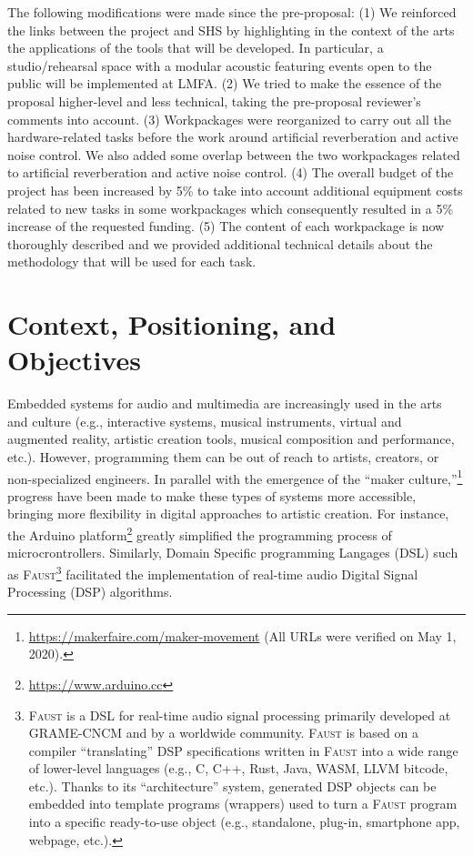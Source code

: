 \documentclass[a4paper,9pt]{extarticle}
\newcommand{\F}{\textsc{Faust}}
\begin{document}
The following modifications were made since the pre-proposal: (1) We reinforced the links between the project and SHS by highlighting in the context of the arts the applications of the tools that will be developed. In particular, a studio/rehearsal space with a modular acoustic featuring events open to the public will be implemented at LMFA. (2) We tried to make the essence of the proposal higher-level and less technical, taking the pre-proposal reviewer's comments into account. (3) Workpackages were reorganized to carry out all the hardware-related tasks before the work around artificial reverberation and active noise control. We also added some overlap between the two workpackages related to artificial reverberation and active noise control. (4) The overall budget of the project has been increased by 5\% to take into account additional equipment costs related to new tasks in some workpackages which consequently resulted in a 5\% increase of the requested funding. (5) The content of each workpackage is now thoroughly described and we provided additional technical details about the methodology that will be used for each task. 

\section{Context, Positioning, and Objectives}

Embedded systems for audio and multimedia are increasingly used in the arts and culture (e.g., interactive systems, musical instruments, virtual and augmented reality, artistic creation tools, musical composition and performance, etc.). However, programming them can be out of reach to artists, creators, or non-specialized engineers. In parallel with the emergence of the ``maker culture,''\footnote{\url{https://makerfaire.com/maker-movement} (All URLs were verified on May 1, 2020).} progress have been made to make these types of systems more accessible, bringing more flexibility in digital approaches to artistic creation. For instance, the Arduino platform\footnote{\url{https://www.arduino.cc}} greatly simplified the programming process of microcrontrollers. Similarly, Domain Specific programming Langages (DSL) such as \F{}\footnote{\F{} is a DSL for real-time audio signal processing primarily developed at GRAME-CNCM and by a worldwide community. \F{} is based on a compiler ``translating'' DSP specifications written in \F{} into a wide range of lower-level languages (e.g., C, C++, Rust, Java, WASM, LLVM bitcode, etc.). Thanks to its ``architecture'' system, generated DSP objects can be embedded into template programs (wrappers) used to turn a \F{} program into a specific ready-to-use object (e.g., standalone, plug-in, smartphone app, webpage, etc.). } 
\cite{Orlarey2009} facilitated the implementation of real-time audio Digital Signal Processing (DSP) algorithms.
\end{document}
